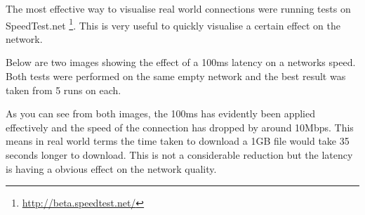 The most effective way to visualise real world connections were running tests on SpeedTest.net \footnote{\url{http://beta.speedtest.net/}}. This is very useful to quickly visualise a certain effect on the network.

Below are two images showing the effect of a 100ms latency on a networks speed. Both tests were performed on the same empty network and the best result was taken from 5 runs on each.



As you can see from both images, the 100ms has evidently been applied effectively and the speed of the connection has dropped by around 10Mbps. This means in real world terms the time taken to download a 1GB file would take 35 seconds longer to download. This is not a considerable reduction but the latency is having a obvious effect on the network quality.
